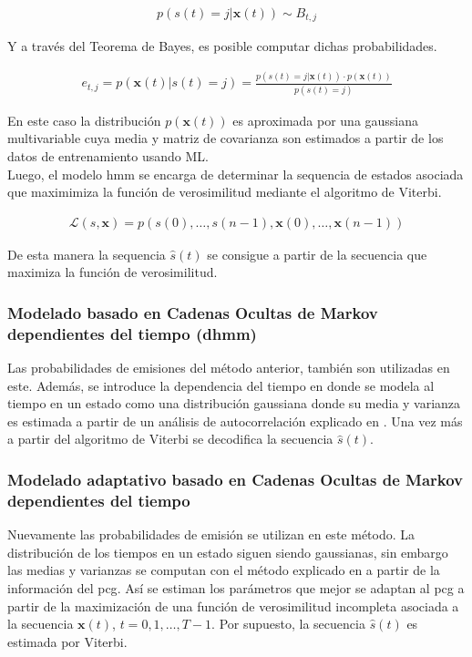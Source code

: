 \begin{align}
  p(s(t) = j | \mathbf{x}(t)) \sim B_{t,j}
\end{align}

\indent Y a través del Teorema de Bayes, es posible computar dichas probabilidades.

\begin{align}
  e_{t,j} = p(\mathbf{x}(t)|s(t)=j) = \frac{p(s(t) = j|\mathbf{x}(t)) \cdot p(\mathbf{x}(t))}{p(s(t) = j)}
\end{align}

\indent En este caso la distribución $p(\mathbf{x}(t))$ es aproximada por una gaussiana multivariable cuya media y matriz de covarianza son estimados a partir de los datos de entrenamiento usando ML. \\
\indent Luego, el modelo \acrshort{hmm} se encarga de determinar la sequencia de estados asociada que maximimiza la función de verosimilitud mediante el algoritmo de Viterbi.

\begin{align}
  \mathcal{L}(s,\mathbf{x}) = p(s(0),\dots,s(n-1),\mathbf{x}(0),\dots,\mathbf{x}(n-1))
\end{align}

\indent De esta manera la sequencia $\hat{s}(t)$ se consigue a partir de la secuencia que maximiza la función de verosimilitud.

\subsubsection*{Modelado basado en Cadenas Ocultas de Markov dependientes del tiempo (\acrshort{dhmm})}

\indent Las probabilidades de emisiones del método anterior, también son utilizadas en este. Además, se introduce la dependencia del tiempo en donde se modela al tiempo en un estado como una distribución gaussiana donde su media y varianza es estimada a partir de un análisis de autocorrelación explicado en \cite{pp:schmidt2010}. Una vez más a partir del algoritmo de Viterbi se decodifica la secuencia $\hat{s}(t)$.

\subsubsection*{Modelado adaptativo basado en Cadenas Ocultas de Markov dependientes del tiempo}

\indent Nuevamente las probabilidades de emisión se utilizan en este método. La distribución de los tiempos en un estado siguen siendo gaussianas, sin embargo las medias y varianzas se computan con el método explicado en \cite{pp:oliveira-renna-coimbra} a partir de la información del \acrshort{pcg}. Así se estiman los parámetros que mejor se adaptan al \acrshort{pcg} a partir de la maximización de una función de verosimilitud incompleta asociada a la secuencia $\mathbf{x}(t)$, $t=0,1,\dots,T-1$. Por supuesto, la secuencia $\hat{s}(t)$ es estimada por Viterbi.